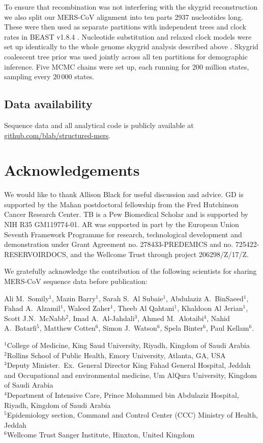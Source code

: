 \documentclass[9pt,lineno]{elife}
\begin{document}
To ensure that recombination was not interfering with the skygrid reconstruction we also split our MERS-CoV alignment into ten parts 2937 nucleotides long.
These were then used as separate partitions with independent trees and clock rates in BEAST v1.8.4 \citep{drummond_bayesian_2012}.
Nucleotide substitution and relaxed clock models were set up identically to the whole genome skygrid analysis described above \citep{drummond_2006,hky_1985,yang_1994}.
Skygrid coalescent tree prior \citep{gill_2013} was used jointly across all ten partitions for demographic inference.
Five MCMC chains were set up, each running for 200 million states, sampling every $20\,000$ states.


\subsection*{Data availability}
Sequence data and all analytical code is publicly available at \href{https://github.com/blab/structured-mers}{github.com/blab/structured-mers}.

\section*{Acknowledgements}
We would like to thank Allison Black for useful discussion and advice.
GD is supported by the Mahan postdoctoral fellowship from the Fred Hutchinson Cancer Research Center.
TB is a Pew Biomedical Scholar and is supported by NIH R35 GM119774-01.
AR was supported in part by the European Union Seventh Framework Programme for research, technological development and demonstration under Grant Agreement no. 278433-PREDEMICS and no. 725422-RESERVOIRDOCS, and the Wellcome Trust through project 206298/Z/17/Z.

We gratefully acknowledge the contribution of the following scientists for sharing MERS-CoV sequence data before publication:

Ali M.\ Somily$^{1}$, Mazin Barry$^{1}$, Sarah S.\ Al Subaie$^{1}$, Abdulaziz A.\ BinSaeed$^{1}$, Fahad A.\ Alzamil$^{1}$, Waleed Zaher$^{1}$, Theeb Al Qahtani$^{1}$, Khaldoon Al Jerian$^{1}$, Scott J.N.\ McNabb$^{2}$, Imad A.\ Al-Jahdali$^{3}$, Ahmed M.\ Alotaibi$^{4}$, Nahid A.\ Batarfi$^{5}$, Matthew Cotten$^{6}$, Simon J.\ Watson$^{6}$, Spela Binter$^{6}$, Paul Kellam$^{6}$.


$^{1}$College of Medicine, King Saud University, Riyadh, Kingdom of Saudi Arabia \\
$^{2}$Rollins School of Public Health, Emory University, Atlanta, GA, USA \\
$^{3}$Deputy Minister.\ Ex.\ General Director King Fahad General Hospital, Jeddah and Occupational and environmental medicine, Um AlQura University, Kingdom of Saudi Arabia \\
$^{4}$Department of Intensive Care, Prince Mohammed bin Abdulaziz Hospital, Riyadh, Kingdom of Saudi Arabia \\
$^{5}$Epidemiology section, Command and Control Center (CCC) Ministry of Health, Jeddah \\
$^{6}$Wellcome Trust Sanger Institute, Hinxton, United Kingdom \\
\end{document}
